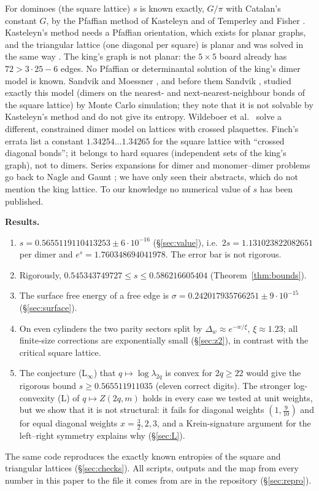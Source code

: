 \documentclass[11pt]{amsart}
\theoremstyle{definition}
\theoremstyle{remark}
\begin{document}
For dominoes (the square lattice) $s$ is known exactly, $G/\pi$ with Catalan's constant $G$, by
the Pfaffian method of Kasteleyn and of Temperley and Fisher \cite{kasteleyn1961,
temperleyfisher1961}. Kasteleyn's method needs a Pfaffian orientation, which exists for planar
graphs, and the triangular lattice (one diagonal per square) is planar and was solved in the
same way \cite{fms2002}. The king's graph is not planar: the $5 \times 5$ board already has
$72 > 3\cdot 25 - 6$ edges. No Pfaffian or determinantal solution of the king's dimer model is
known. Sandvik and Moessner \cite{sandvikmoessner2006}, and before them Sandvik
\cite{sandvik2003}, studied exactly this model (dimers on the nearest- and
next-nearest-neighbour bonds of the square lattice) by Monte Carlo simulation; they note that it
is not solvable by Kasteleyn's method and do not give its entropy. Wildeboer et
al.\ \cite{wildeboer2026} solve a different, constrained dimer model on lattices with crossed
plaquettes. Finch's errata \cite[\S 5.12]{finch2020errata} list a constant
$1.34254\ldots 1.34265$ for the square lattice with ``crossed diagonal bonds''; it belongs to
hard squares (independent sets of the king's graph), not to dimers. Series expansions for
dimer and monomer--dimer problems go back to Nagle \cite{nagle1966} and Gaunt \cite{gaunt1969};
we have only seen their abstracts, which do not mention the king lattice. To our knowledge no
numerical value of $s$ has been published.

\medskip\noindent\textbf{Results.}
\begin{enumerate}
\item $s = 0.5655119110413253 \pm 6\cdot10^{-16}$ (\S\ref{sec:value}), i.e.\ $2s = 1.131023822082651$
  per dimer and $e^{s} = 1.760348694041978$. The error bar is not rigorous.
\item Rigorously, $0.545343749727 \le s \le 0.586216605404$ (Theorem~\ref{thm:bounds}).
\item The surface free energy of a free edge is $\sigma = 0.242017935766251 \pm 9\cdot10^{-15}$
  (\S\ref{sec:surface}).
\item On even cylinders the two parity sectors split by $\Delta_w \approx e^{-w/\xi}$,
  $\xi \approx 1.23$; all finite-size corrections are exponentially small (\S\ref{sec:z2}),
  in contrast with the critical square lattice.
\item The conjecture (L$_\infty$) that $q \mapsto \log\lambda_{2q}$ is convex for $2q \ge 22$
  would give the rigorous bound $s \ge 0.565511911035$ (eleven correct digits). The stronger
  log-convexity (L) of $q \mapsto Z(2q, m)$ holds in every case we tested at unit weights, but
  we show that it is not structural: it fails for diagonal weights $(1, \tfrac{9}{10})$ and for
  equal diagonal weights $x = \tfrac32, 2, 3$, and a Krein-signature argument for the left--right
  symmetry explains why (\S\ref{sec:L}).
\end{enumerate}
The same code reproduces the exactly known entropies of the square and triangular lattices
(\S\ref{sec:checks}). All scripts, outputs and the map from every number in this paper to the
file it comes from are in the repository (\S\ref{sec:repro}).
\end{document}
